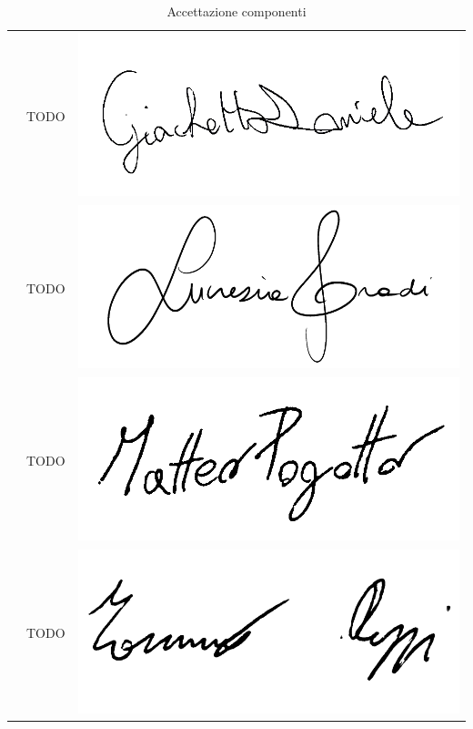 \begin{table}[H]
\begin{center}
\begin{tabular}{ c c c}
				\Daniele{} & TODO & \includegraphics[scale = 0.16]{components/img/firme_membri/firma-dg.png} \\
				\Lucrezia{} & TODO & \includegraphics[scale = 0.5]{components/img/firme_membri/firma-lg.png} \\
				\Matteo{} & TODO & \includegraphics[scale = 0.12]{components/img/firme_membri/firma-mp.png} \\
				\Tommaso{} & TODO & \includegraphics[scale = 0.5]{components/img/firme_membri/firma-tp.png} \\
				
				\bottomrule
			\end{tabular}
			\caption{Accettazione componenti}
		\end{center}
    \end{table}

